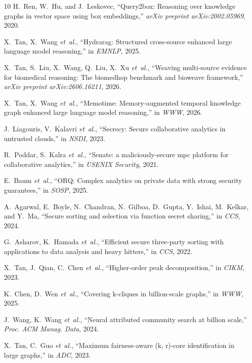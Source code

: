 \documentclass[conference,compsoc,letterpaper]{IEEEtran}
\theoremstyle{definition}
\theoremstyle{remark}
\begin{document}
\begin{thebibliography}{10}
H.~Ren, W.~Hu, and J.~Leskovec, ``Query2box: Reasoning over knowledge graphs in
  vector space using box embeddings,'' \emph{arXiv preprint arXiv:2002.05969},
  2020.

X.~Tan, X.~Wang \emph{et~al.}, ``Hydrarag: Structured cross-source enhanced
  large language model reasoning,'' in \emph{EMNLP}, 2025.

X.~Tan, S.~Liu, X.~Wang, Q.~Liu, X.~Xu \emph{et~al.}, ``Weaving multi-source
  evidence for biomedical reasoning: The biomedhop benchmark and bioweave
  framework,'' \emph{arXiv preprint arXiv:2606.16211}, 2026.

X.~Tan, X.~Wang \emph{et~al.}, ``Memotime: Memory-augmented temporal knowledge
  graph enhanced large language model reasoning,'' in \emph{WWW}, 2026.

J.~Liagouris, V.~Kalavri \emph{et~al.}, ``Secrecy: Secure collaborative
  analytics in untrusted clouds,'' in \emph{NSDI}, 2023.

R.~Poddar, S.~Kalra \emph{et~al.}, ``Senate: a maliciously-secure mpc platform
  for collaborative analytics,'' in \emph{USENIX Security}, 2021.

E.~Baum \emph{et~al.}, ``{ORQ}: Complex analytics on private data with strong
  security guarantees,'' in \emph{SOSP}, 2025.

A.~Agarwal, E.~Boyle, N.~Chandran, N.~Gilboa, D.~Gupta, Y.~Ishai, M.~Kelkar,
  and Y.~Ma, ``Secure sorting and selection via function secret sharing,'' in
  \emph{CCS}, 2024.

G.~Asharov, K.~Hamada \emph{et~al.}, ``Efficient secure three-party sorting
  with applications to data analysis and heavy hitters,'' in \emph{CCS}, 2022.

X.~Tan, J.~Qian, C.~Chen \emph{et~al.}, ``Higher-order peak decomposition,'' in
  \emph{CIKM}, 2023.

K.~Chen, D.~Wen \emph{et~al.}, ``Covering k-cliques in billion-scale graphs,''
  in \emph{WWW}, 2025.

J.~Wang, K.~Wang \emph{et~al.}, ``Neural attributed community search at billion
  scale,'' \emph{Proc. {ACM} Manag. Data}, 2024.

X.~Tan, C.~Guo \emph{et~al.}, ``Maximum fairness-aware (k, r)-core
  identification in large graphs,'' in \emph{ADC}, 2023.


\end{thebibliography}
\end{document}
